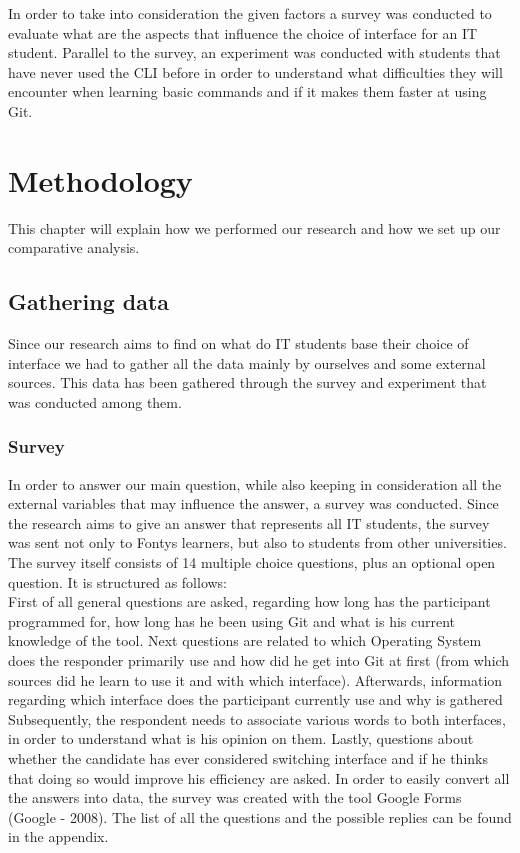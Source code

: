 \documentclass[]{report}
\begin{document}
	In order to take into consideration the given factors a survey was conducted to evaluate what are the aspects that influence the choice of interface for an IT student. Parallel to the survey, an experiment was conducted with students that have never used the CLI before in order to understand what difficulties they will encounter when learning basic commands and if it makes them faster at using Git. 
	
	\section{Methodology}
	This chapter will explain how we performed our research and how we set up our comparative analysis.
	
	\subsection{Gathering data}
	Since our research aims to find  on what do IT students base their choice of interface we had to gather all the data mainly by ourselves and some external sources.  This data has been gathered through the survey and experiment that was conducted among them.
	\subsubsection{Survey}
	
	In order to answer our main question, while also keeping in consideration all the external variables that may influence the answer, a survey was conducted.
	Since the research aims to give an answer that represents all IT students, the survey was sent not only to Fontys learners, but also to students from other universities.
	The survey itself consists of 14 multiple choice questions, plus an optional open question. It is structured as follows:\\
	First of all general questions are asked, regarding how long has the participant programmed for, how long has he been using Git and what is his current knowledge of the tool.
	Next questions are related to which Operating System does the responder primarily use and how did he get into Git at first (from which sources did he learn to use it and with which interface).
	Afterwards, information regarding which interface does the participant currently use and why is gathered
	Subsequently, the respondent needs to associate various words to both interfaces, in order to understand what is his opinion on them.
	Lastly, questions about whether the candidate has ever considered switching interface and if he thinks that doing so would improve his efficiency are asked.
	In order to easily convert all the answers into data, the survey was created with the tool Google Forms (Google - 2008).
	The list of all the questions and the possible replies can be found in the appendix.
	
\end{document}
